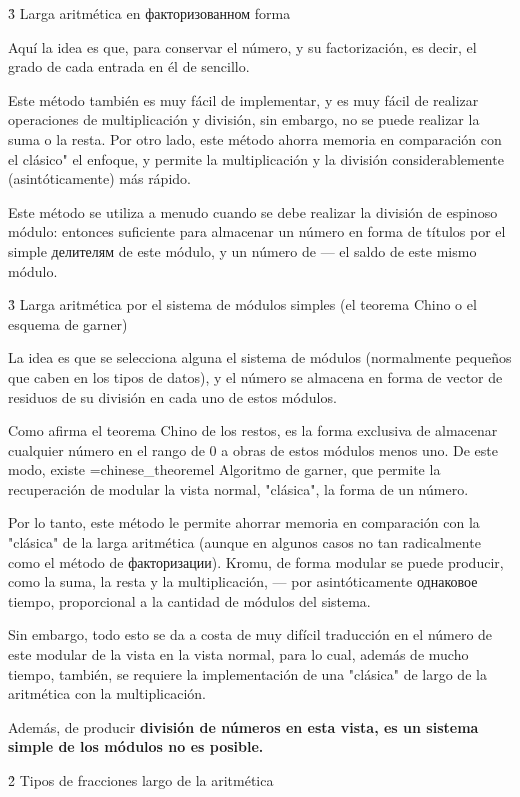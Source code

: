 \h3{ Larga aritmética en факторизованном forma }

Aquí la idea es que, para conservar el número, y su factorización, es decir, el grado de cada entrada en él de sencillo.

Este método también es muy fácil de implementar, y es muy fácil de realizar operaciones de multiplicación y división, sin embargo, no se puede realizar la suma o la resta. Por otro lado, este método ahorra memoria en comparación con el clásico" el enfoque, y permite la multiplicación y la división considerablemente (asintóticamente) más rápido.

Este método se utiliza a menudo cuando se debe realizar la división de espinoso módulo: entonces suficiente para almacenar un número en forma de títulos por el simple делителям de este módulo, y un número de --- el saldo de este mismo módulo.


\h3{ Larga aritmética por el sistema de módulos simples (el teorema Chino o el esquema de garner) }

La idea es que se selecciona alguna el sistema de módulos (normalmente pequeños que caben en los tipos de datos), y el número se almacena en forma de vector de residuos de su división en cada uno de estos módulos.

Como afirma el teorema Chino de los restos, es la forma exclusiva de almacenar cualquier número en el rango de 0 a obras de estos módulos menos uno. De este modo, existe \algohref=chinese_theorem{el Algoritmo de garner}, que permite la recuperación de modular la vista normal, "clásica", la forma de un número.

Por lo tanto, este método le permite ahorrar memoria en comparación con la "clásica" de la larga aritmética (aunque en algunos casos no tan radicalmente como el método de факторизации). Kromu, de forma modular se puede producir, como la suma, la resta y la multiplicación, --- por asintóticamente однаковое tiempo, proporcional a la cantidad de módulos del sistema.

Sin embargo, todo esto se da a costa de muy difícil traducción en el número de este modular de la vista en la vista normal, para lo cual, además de mucho tiempo, también, se requiere la implementación de una "clásica" de largo de la aritmética con la multiplicación.

Además, de producir \bf{división} de números en esta vista, es un sistema simple de los módulos no es posible.


\h2{ Tipos de fracciones largo de la aritmética }


